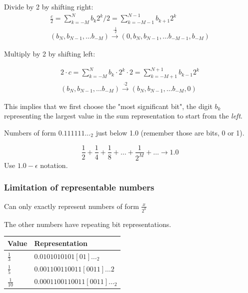 \documentclass[10pt]{amsart}
\begin{document}
\begin{multicols*}{2}
Divide by 2 by shifting right: 
\begin{equation}
\begin{gathered} 
\frac{c}{2} = \sum_{k=-M}^N b_k 2^k/2 = \sum_{k=-M-1}^{N-1} b_{k+1} 2^k \\	
(b_N, b_{N-1}, \dots b_{-M}) \xrightarrow{ \cdot \frac{1}{2}} (0, b_N, b_{N-1}, \dots b_{-M-1}, b_{-M})
\end{gathered} 
\end{equation}

Multiply by 2 by shifting left:

\begin{equation}
\begin{gathered}
2  \cdot c = \sum_{k=-M}^N b_k \cdot 2^k \cdot 2 = \sum_{k=-M+1}^{N+1} b_{k-1} 2^k \\
(b_N, b_{N-1}, \dots b_{-M}) \xrightarrow{ \cdot 2} (b_N, b_{N-1}, \dots b_{-M} , 0)
\end{gathered}
\end{equation}

This implies that we first choose the "most significant bit", the digit $b_k$ representing the largest value in the sum representation to start from the \emph{left}.

Numbers of form $0.111111\dots_2$ just below 1.0 (remember those are bits, 0 or 1).

\[
\frac{1}{2} + \frac{1}{4} + \frac{1}{8} + \dots + \frac{1}{2^{M}} + \dots \to 1.0
\]
Use $1.0 - \epsilon$ notation.

\subsubsection{Limitation of representable numbers}

Can only exactly represent numbers of form $\frac{x}{2^k}$

The other numbers have repeating bit representations.

\begin{center}
	\begin{tabular}{ l | l }
		\hline
		Value & Representation \\ \hline
		$\frac{1}{3}$ & $0.0101010101[01]\dots_2$ \\ 
		$\frac{1}{5}$ & $0.001100110011[0011] \dots 2$ \\
		$\frac{1}{10}$ & $0.0001100110011[0011] \dots_2$ \\
		\hline
	\end{tabular}
\end{center}


\end{multicols*}
\end{document}
